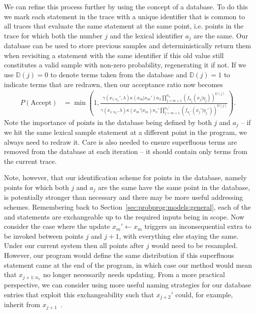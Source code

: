 We can refine this process further by using the concept of a database.  To do this we mark each \sample
statement in the trace with a unique identifier that is common to all traces that evaluate the same \sample
statement at the same point, i.e. points in the trace for which both the \sample number $j$ and 
the lexical \sample identifier $a_j$ are the same.  Our database can be used to store previous samples and
deterministically return them when revisiting a \sample statement with the same identifier if this old
value still constitutes a valid sample with non-zero probability, regenerating it if not.  
If we use $\mathbb{D}(j)=0$ to denote terms taken from
the database and $\mathbb{D}(j)=1$ to indicate terms that are redrawn, then our acceptance ratio now becomes
\begin{align}
P(\text{Accept}) &= \min\left(1, \frac{\gamma(x_{1:n_x}',\lambda) \kappa(x_m | x_{m}') n_x \prod_{j=m+1}^{n_x} 
	\left(f_{a_{j}} (x_j | \eta_j)\right)^{\mathbb{D}(j)}}
{\gamma(x_{1:n_x},\lambda) \kappa(x_m' | x_{m})  n_x' \prod_{j=m+1}^{n_x'} \left(f_{a_{j}'} (x_j' | \eta_j')\right)^{\mathbb{D}(j)}}\right).
\end{align}
Note the importance of points in the database being defined by both $j$ and $a_j$ -- if we hit the same
lexical sample statement at a different point in the program, we always need to redraw it.
Care is also needed to ensure superfluous terms are removed from the database at each iteration -- it should
contain only terms from the current trace.  

Note, however, that our identification scheme for points in the database, namely points for which both $j$ and $a_j$ are the same
have the same point in the database, is
potentially stronger than necessary and there may be more useful addressing schemes.  Remembering back
to Section~\ref{sec:probprog:models:general}, each of the \sample and \observe statements are exchangeable up to
the required inputs being in scope.  Now consider the case where the update $x_m'\leftarrow x_m$ triggers an
inconsequential extra \sample to be invoked between points $j$ and $j+1$, with everything else staying the same.
Under our current system then all points after $j$ would need to be resampled.  However, our program would
define the same distribution if this superfluous \sample statement came at the end of the program, in which case
our method would mean that $x_{j+1:n_x}$ no longer necessarily needs updating.  From a more practical perspective,
we can consider using more useful naming strategies for our database entries that exploit this exchangeability such
that $x_{j+2}'$ could, for example, inherit from $x_{j+1}$~\citep{wingate2011lightweight}.  

